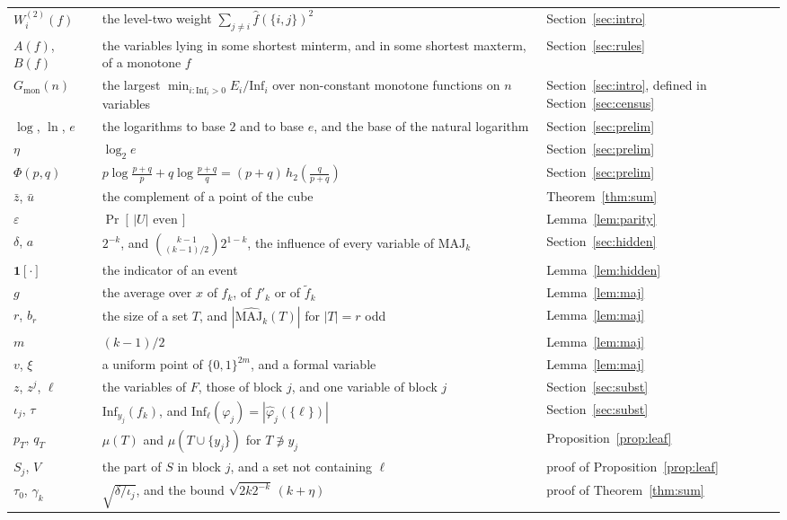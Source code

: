 \documentclass[11pt]{amsart}
\theoremstyle{remark}
\newcommand{\Inf}{\mathrm{Inf}}
\newcommand{\MAJ}{\mathrm{MAJ}}
\begin{document}
\begin{longtable}{@{}>{\raggedright\arraybackslash}p{}>{\raggedright\arraybackslash}p{}>{\raggedright\arraybackslash}p{}@{}}
$W^{(2)}_i(f)$ & the level-two weight $\sum_{j\ne i}\hat f(\{i,j\})^2$ & Section~\ref{sec:intro} \\
$A(f)$, $B(f)$ & the variables lying in some shortest minterm, and in some shortest maxterm, of a monotone $f$ & Section~\ref{sec:rules} \\
$G_{\mathrm{mon}}(n)$ & the largest $\min_{i:\Inf_i>0}E_i/\Inf_i$ over non-constant monotone functions on $n$ variables & Section~\ref{sec:intro}, defined in Section~\ref{sec:census} \\
$\log$, $\ln$, $e$ & the logarithms to base $2$ and to base $e$, and the base of the natural logarithm & Section~\ref{sec:prelim} \\
$\eta$ & $\log_2e$ & Section~\ref{sec:prelim} \\
$\Phi(p,q)$ & $p\log\frac{p+q}p+q\log\frac{p+q}q=(p+q)\,h_2(\frac q{p+q})$ & Section~\ref{sec:prelim} \\
$\bar z$, $\bar u$ & the complement of a point of the cube & Theorem~\ref{thm:sum} \\
$\varepsilon$ & $\Pr[\,|U|\text{ even}\,]$ & Lemma~\ref{lem:parity} \\
$\delta$, $a$ & $2^{-k}$, and $\binom{k-1}{(k-1)/2}2^{1-k}$, the influence of every variable of $\MAJ_k$ & Section~\ref{sec:hidden} \\
$\mathbf 1[\cdot]$ & the indicator of an event & Lemma~\ref{lem:hidden} \\
$g$ & the average over $x$ of $f_k$, of $f'_k$ or of $\tilde f_k$ & Lemma~\ref{lem:maj} \\
$r$, $b_r$ & the size of a set $T$, and $|\widehat{\MAJ_k}(T)|$ for $|T|=r$ odd & Lemma~\ref{lem:maj} \\
$m$ & $(k-1)/2$ & Lemma~\ref{lem:maj} \\
$v$, $\xi$ & a uniform point of $\{0,1\}^{2m}$, and a formal variable & Lemma~\ref{lem:maj} \\
$z$, $z^j$, $\ell$ & the variables of $F$, those of block $j$, and one variable of block $j$ & Section~\ref{sec:subst} \\
$\iota_j$, $\tau$ & $\Inf_{y_j}(f_k)$, and $\Inf_\ell(\varphi_j)=|\hat\varphi_j(\{\ell\})|$ & Section~\ref{sec:subst} \\
$p_T$, $q_T$ & $\mu(T)$ and $\mu(T\cup\{y_j\})$ for $T\not\ni y_j$ & Proposition~\ref{prop:leaf} \\
$S_j$, $V$ & the part of $S$ in block $j$, and a set not containing $\ell$ & proof of Proposition~\ref{prop:leaf} \\
$\tau_0$, $\gamma_k$ & $\sqrt{\delta/\iota_j}$, and the bound $\sqrt{2k2^{-k}}\,(k+\eta)$ & proof of Theorem~\ref{thm:sum} \\

\end{longtable}
\end{document}
